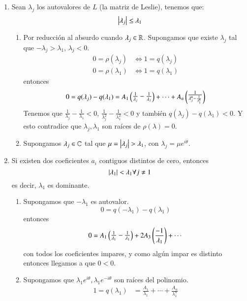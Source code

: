 \begin{enumerate}[1)]
    \item Sean $\lambda_j$ los autovalores de $L$ (la matriz de Leslie), tenemos que:
    $$
        \left|\lambda_j\right| \leq \lambda_1
    $$
    \begin{enumerate}[i]
        \item Por reducción al absurdo cuando $\lambda_j \in \mathbb{R}$. Supongamos que existe $\lambda_j$ tal que $-\lambda_j > \lambda_1$, $\lambda_j < 0$.\\
        \begin{align*}
            0 = \rho(\lambda_j) &\iff 1 = q(\lambda_j)\\
            0 = \rho(\lambda_1) &\iff 1 = q(\lambda_1)
        \end{align*}
        entonces
        $$
            0 = q(\lambda_j) - q(\lambda_1) = A_1\px{\frac{1}{\lambda_j} - \frac{1}{\lambda_1}} + \cdots + A_n\px{\frac{1}{\lambda_j^n - \frac{1}{\lambda_1^n}}}
        $$
        Tenemos que $\frac{1}{\lambda_j} - \frac{1}{\lambda_1} < 0$, $\frac{1}{\lambda_j^2} - \frac{1}{\lambda_1^2} < 0$ y también $q(\lambda_j) - q(\lambda_1) < 0$.
        Y esto contradice que $\lambda_j, \lambda_1$ son raíces de $\rho(\lambda) = 0$.
        \item Supongamos $\lambda_j \in \mathbb{C}$ tal que $\mu = \left|\lambda_j\right| > \lambda_1$, con $\lambda_j = \mu e^{i\theta}$.
    \end{enumerate}
    \item Si existen dos coeficientes $a_i$ contiguos distintos de cero, entonces
    $$
        \left|\lambda_1\right| < \lambda_1 \forall j \neq 1
    $$
    es decir, $\lambda_1$ es dominante.
    \begin{enumerate}[i]
        \item Supongamos que $-\lambda_1$ es autovalor.
        $$
            0 = q(-\lambda_1) - q(\lambda_1)
        $$
        entonces
        $$
            0 = A_1\px{\frac{1}{\lambda_1} - \frac{1}{\lambda_1}} + 2A_3\pfrac{-1}{\lambda_1} + \cdots
        $$
        con todos los coeficientes impares, y como algún impar es distinto entonces llegamos a que $0 < 0$.
        \item Supongamos que $\lambda_1e^{i\theta}, \lambda_1e^{-i\theta}$ son raíces del polinomio.\\
        \begin{align*}
            1 = q(\lambda_1) &= \frac{A_1}{\lambda_1} + \cdots + \frac{A_n}{\lambda_1^n}\\

\end{align*}
\end{enumerate}
\end{enumerate}

